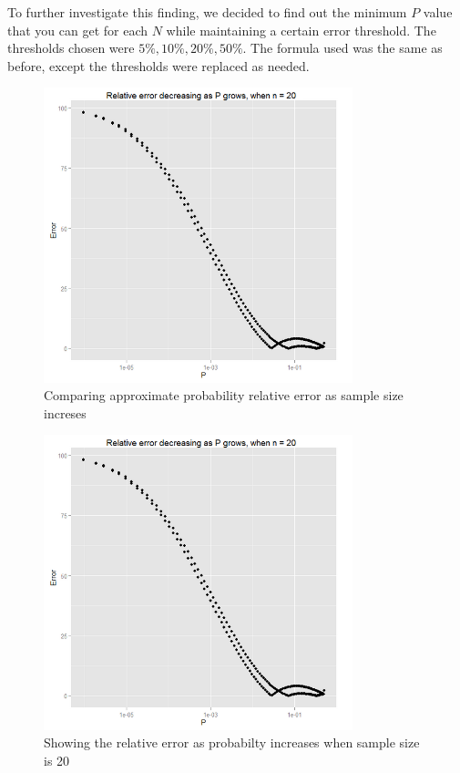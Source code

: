 \documentclass[12pt]{article}
\begin{document}
To further investigate this finding, we decided to find out the minimum $P$ value that you can get for each $N$ while maintaining a certain error threshold. The thresholds chosen were $5\%, 10\%, 20\%, 50\%$. The formula used was the same as before, except the thresholds were replaced as needed.

\begin{figure}[!h]
	\centering
  \includegraphics[width=0.8\textwidth]{RelativeErrorDecreasingPgrowsN20}
	\caption{Comparing approximate probability relative error as sample size increses}
	\label{fig:PvsN}
\end{figure}

\begin{figure}[!h]
	\centering
  \includegraphics[width=0.8\textwidth]{RelativeErrorDecreasingPgrowsN20}
	\caption{Showing the relative error as probabilty increases when sample size is 20}
	\label{fig:RelativeErrorDecresingPgrows}
\end{figure}
\end{document}
